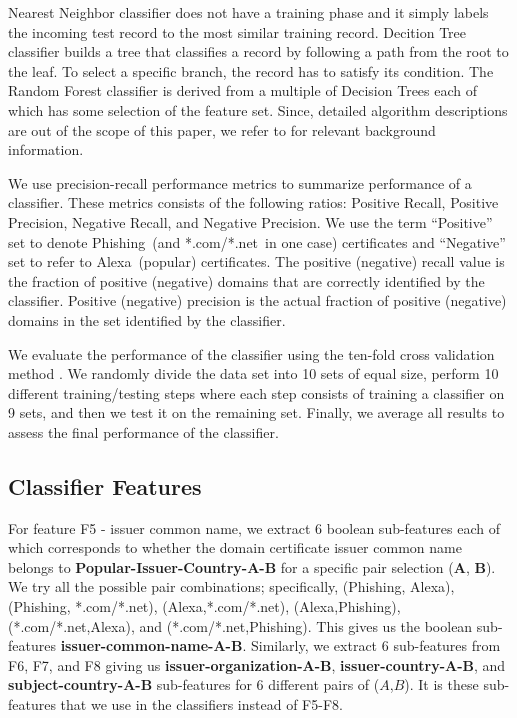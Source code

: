 \documentclass[twocolumn]{article}
\newcommand{\Alexa}{\textsf{Alexa}}
\newcommand{\phishing}{\textsf{Phishing}}
\newcommand{\comnet}{\textsf{*.com/*.net}}
\begin{document}
Nearest Neighbor classifier does not have a training phase and it simply labels the incoming test record to the most similar training record. Decition Tree classifier builds a tree that classifies a record by following a path from the root to the leaf. To select a specific branch, the record has to satisfy its condition. The Random Forest classifier is derived from a multiple of Decision Trees each of which has some selection of the feature set. Since, detailed algorithm descriptions are out of the scope of this paper,
we refer to \cite{mlearn1,bagging,boost-bag-c4.5,boosting,boost-bag-c4.5}
for relevant background information. 

We use precision-recall performance metrics to summarize performance of a classifier. These metrics consists of the following
ratios: Positive Recall, Positive Precision, Negative Recall, and Negative Precision. We use the term ``Positive'' set to
denote \phishing\ (and  \comnet\ in one case) certificates  and ``Negative'' set to refer to \Alexa\ (popular) certificates.  The positive
(negative) recall value is the fraction of positive (negative) domains that are correctly identified by the classifier.
Positive (negative) precision is the actual fraction of positive (negative) domains in the set identified by the classifier.

We evaluate the performance of the classifier using the ten-fold cross validation method \cite{mlearn1}.
We randomly divide the data set into 10 sets of equal size, perform 10 different training/testing steps
where each step consists of training a classifier on 9 sets, and then we test it on the remaining set.
Finally, we average all results to assess the final performance of the classifier.

\subsection{Classifier Features}\label{sec:classfeatures}
For feature F5 - issuer common name, we extract 6 boolean sub-features each of which corresponds to whether the domain certificate issuer common name belongs to \textbf{Popular-Issuer-Country-A-B}  for a specific pair selection (\textbf{A}, \textbf{B}). We try all the possible pair combinations; specifically, (\phishing, \Alexa), (\phishing, \comnet), (\Alexa,\comnet), (\Alexa,\phishing), (\comnet,\Alexa), and (\comnet,\phishing). This gives us the boolean sub-features \textbf{issuer-common-name-A-B}. Similarly, we extract 6 sub-features from F6, F7, and F8 giving us \textbf{issuer-organization-A-B}, \textbf{issuer-country-A-B}, and \textbf{subject-country-A-B} sub-features for 6 different pairs of ($A$,$B$). It is these sub-features that we use in the classifiers instead of F5-F8. 
\end{document}
